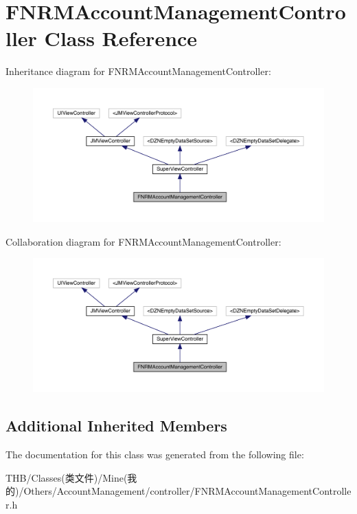 \hypertarget{interface_f_n_r_m_account_management_controller}{}\section{F\+N\+R\+M\+Account\+Management\+Controller Class Reference}
\label{interface_f_n_r_m_account_management_controller}


Inheritance diagram for F\+N\+R\+M\+Account\+Management\+Controller\+:\nopagebreak
\begin{figure}[H]
\begin{center}
\leavevmode
\includegraphics[width=350pt]{interface_f_n_r_m_account_management_controller__inherit__graph}
\end{center}
\end{figure}


Collaboration diagram for F\+N\+R\+M\+Account\+Management\+Controller\+:\nopagebreak
\begin{figure}[H]
\begin{center}
\leavevmode
\includegraphics[width=350pt]{interface_f_n_r_m_account_management_controller__coll__graph}
\end{center}
\end{figure}
\subsection*{Additional Inherited Members}


The documentation for this class was generated from the following file\+:\begin{DoxyCompactItemize}
\item 
T\+H\+B/\+Classes(类文件)/\+Mine(我的)/\+Others/\+Account\+Management/controller/F\+N\+R\+M\+Account\+Management\+Controller.\+h\end{DoxyCompactItemize}

